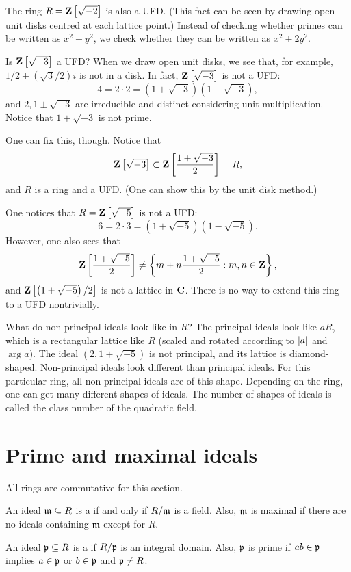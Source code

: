 \documentclass[11pt, oneside,margin=1in]{article}
\begin{document}
The ring $R=\mathbf Z\left[\sqrt{-2}\right]$ is also a UFD. (This fact can be seen by drawing open unit disks centred at each lattice point.) Instead of checking whether primes can be written as $x^2+y^2$, we check whether they can be written as $x^2 + 2y^2$.

Is $\mathbf Z\left[\sqrt{-3}\right]$ a UFD? When we draw open unit disks, we see that, for example, $1/2 + (\sqrt3/2)i $ is not in a disk. In fact, $\mathbf Z\left[\sqrt{-3}\right]$ is not a UFD: 
$$
4 = 2\cdot 2 = (1+\sqrt{-3})(1-\sqrt{-3}),
$$
and $2, 1\pm \sqrt{-3}$ are irreducible and distinct considering unit multiplication. Notice that $1+\sqrt{-3}$ is not prime.

One can fix this, though. Notice that
$$
\mathbf Z\left[ \sqrt{-3}\right] \subset \mathbf Z\left[ \frac{1 + \sqrt{-3}}{2}\right] = R,
$$
and $R$ is a ring and a UFD. (One can show this by the unit disk method.)

One notices that $R= \mathbf Z\left[\sqrt{-5}\right]$ is not a UFD:
$$
6 = 2\cdot 3 = (1+\sqrt{-5})(1-\sqrt{-5}). 
$$
However, one also sees that
$$
\mathbf Z\left[ \frac{1 + \sqrt{-5}}{2}\right] \ne \left\{ m + n\frac{1+\sqrt{-5}}{2} :m,n\in \mathbf Z\right\}, 
$$
and $\mathbf Z\left[ \left({1 + \sqrt{-5}}\right)/{2}\right]$ is not a lattice in $\mathbf C$. There is no way to extend this ring to a UFD nontrivially.

What do non-principal ideals look like in $R$? The principal ideals look like $aR$, which is a rectangular lattice like $R$ (scaled and rotated according to $\left \lvert a \right \rvert$ and $\arg a$). The ideal $(2, 1+\sqrt{-5})$ is not principal, and its lattice is diamond-shaped. Non-principal ideals look different than principal ideals. For this particular ring, all non-principal ideals are of this shape. Depending on the ring, one can get many different shapes of ideals. The number of shapes of ideals is called the class number of the quadratic field.

\section{Prime and maximal ideals}
All rings are commutative for this section. 
\begin{definition}
An ideal $\mathfrak m\subseteq R$ is a  if and only if $R/\mathfrak m$ is a field. Also, $\mathfrak m$ is maximal if there are no ideals containing $\mathfrak m$ except for $R$.
\end{definition}

\begin{definition}
An ideal $\mathfrak p\subseteq R$ is a  if $R/\mathfrak p$ is an integral domain. Also, $\mathfrak p$ is prime if $ab\in \mathfrak p$ implies $a\in \mathfrak p$ or $b\in \mathfrak p$ and $\mathfrak p\ne R$.
\end{definition}
\end{document}

